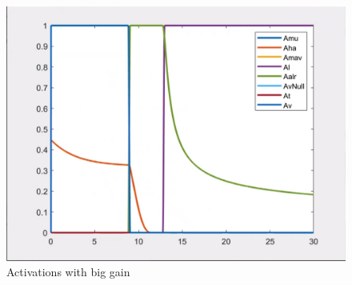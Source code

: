 \documentclass{article}
\begin{document}
\begin{figure}[htpb]
\begin{minipage}{0.40\textwidth}
\includegraphics[width=\textwidth]{313_b_Activation.png}
\caption{Activations with big gain}\label{act_w_b} 
\end{minipage}
\end{figure}
\end{document}
